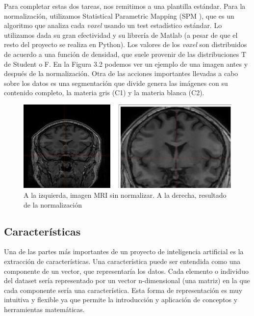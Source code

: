Para completar estas dos tareas, nos remitimos a una plantilla estándar. Para la normalización, utilizamos Statistical Parametric Mapping (SPM \cite{spm}), que es un algoritmo que analiza cada \textit{voxel} usando un test estadístico estándar. Lo utilizamos dada su gran efectividad y su librería de Matlab (a pesar de que el resto del proyecto se realiza en Python). Los valores de los \textit{voxel} son distribuidos de acuerdo a una función de densidad, que suele provenir de las distribuciones T de Student o F. En la Figura 3.2 podemos ver un ejemplo de una imagen antes y después de la normalización. Otra de las acciones importantes llevadas a cabo sobre los datos es una segmentación que divide genera las imágenes con su contenido completo, la materia gris (C1) y la materia blanca (C2).

 \begin{figure}[H] %
	\centering
	\includegraphics[scale=0.6]{norm.png}  %
	\caption{A la izquierda, imagen MRI sin normalizar. A la derecha, resultado de la normalización} 
	\label{fig:norm}
\end{figure}

\subsection{Características}

Una de las partes más importantes de un proyecto de inteligencia artificial es la extracción de características. Una característica puede ser entendida como una componente de un vector, que representaría los datos. Cada elemento o individuo del dataset sería representado por un vector n-dimensional (una matriz) en la que cada componente sería una característica. Esta forma de representación es muy intuitiva y flexible ya que permite la introducción y aplicación de conceptos y herramientas matemáticas. \\


